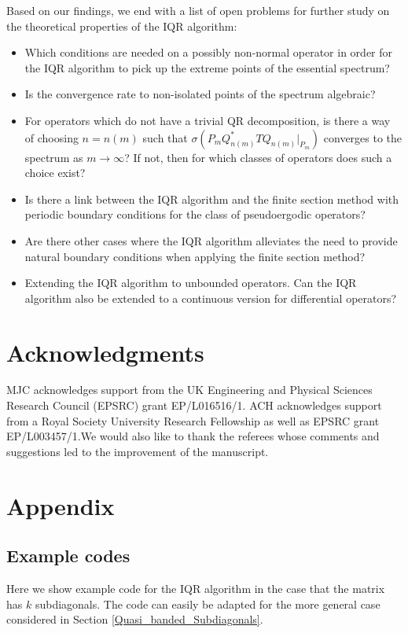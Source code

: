 \documentclass[a4paper,10pt]{article}
\begin{document}
Based on our findings, we end with a list of open problems for further study on the theoretical properties of the IQR algorithm:
\begin{itemize}
	\item Which conditions are needed on a possibly non-normal operator in order for the IQR algorithm to pick up the extreme points of the essential spectrum?
	\item Is the convergence rate to non-isolated points of the spectrum algebraic? 
	\item For operators which do not have a trivial QR decomposition, is there a way of choosing $n=n(m)$ such that $\sigma(P_{m}Q_{n(m)}^*TQ_{n(m)}|_{P_{{m}}})$ converges to the spectrum as $m\rightarrow\infty$? If not, then for which classes of operators does such a choice exist?
	\item Is there a link between the IQR algorithm and the finite section method with periodic boundary conditions for the class of pseudoergodic operators?
	\item Are there other cases where the IQR algorithm alleviates the need to provide natural boundary conditions when applying the finite section method?
	\item Extending the IQR algorithm to unbounded operators. Can the IQR algorithm also be extended to a continuous version for differential operators?
\end{itemize}


\section*{Acknowledgments} MJC acknowledges support from the UK Engineering and Physical Sciences Research Council (EPSRC) grant EP/L016516/1. ACH acknowledges support from a Royal Society University Research Fellowship as well as EPSRC grant EP/L003457/1.We would also like to thank the referees whose comments and suggestions led to the improvement of the manuscript.
\appendix

\section{Appendix}


\subsection{Example codes}

Here we show example code for the IQR algorithm in the case that the matrix has $k$ subdiagonals. The code can easily be adapted for the more general case considered in Section \ref{Quasi_banded_Subdiagonals}.
\end{document}
